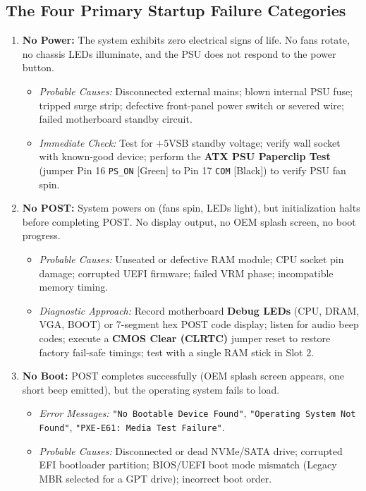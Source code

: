 \subsection{The Four Primary Startup Failure Categories}
\begin{enumerate}[label=\bfseries\arabic*.]
    \item \textbf{No Power:} The system exhibits zero electrical signs of life. No fans rotate, no chassis LEDs illuminate, and the PSU does not respond to the power button.
    \begin{itemize}
        \item \textit{Probable Causes:} Disconnected external mains; blown internal PSU fuse; tripped surge strip; defective front-panel power switch or severed wire; failed motherboard standby circuit.
        \item \textit{Immediate Check:} Test for $+5\text{VSB}$ standby voltage; verify wall socket with known-good device; perform the \textbf{ATX PSU Paperclip Test} (jumper Pin 16 \texttt{PS\_ON} [Green] to Pin 17 \texttt{COM} [Black]) to verify PSU fan spin.
    \end{itemize}
    \item \textbf{No POST:} System powers on (fans spin, LEDs light), but initialization halts before completing POST. No display output, no OEM splash screen, no boot progress.
    \begin{itemize}
        \item \textit{Probable Causes:} Unseated or defective RAM module; CPU socket pin damage; corrupted UEFI firmware; failed VRM phase; incompatible memory timing.
        \item \textit{Diagnostic Approach:} Record motherboard \textbf{Debug LEDs} (CPU, DRAM, VGA, BOOT) or 7-segment hex POST code display; listen for audio beep codes; execute a \textbf{CMOS Clear (CLRTC)} jumper reset to restore factory fail-safe timings; test with a single RAM stick in Slot 2.
    \end{itemize}
    \item \textbf{No Boot:} POST completes successfully (OEM splash screen appears, one short beep emitted), but the operating system fails to load.
    \begin{itemize}
        \item \textit{Error Messages:} \texttt{"No Bootable Device Found"}, \texttt{"Operating System Not Found"}, \texttt{"PXE-E61: Media Test Failure"}.
        \item \textit{Probable Causes:} Disconnected or dead NVMe/SATA drive; corrupted EFI bootloader partition; BIOS/UEFI boot mode mismatch (Legacy MBR selected for a GPT drive); incorrect boot order.

\end{itemize}
\end{enumerate}
